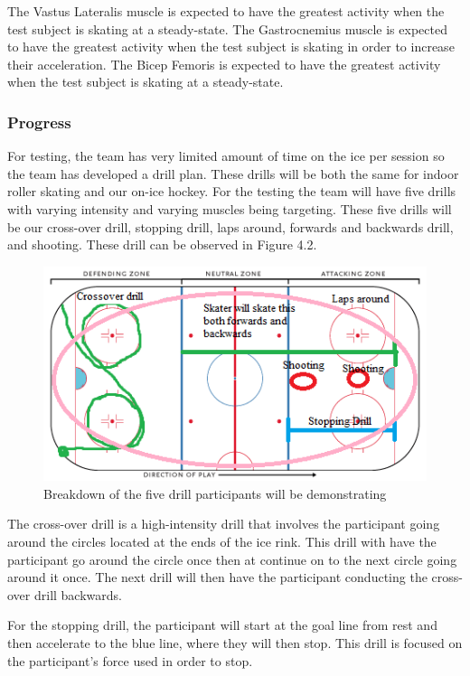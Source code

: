The Vastus Lateralis muscle is expected to have the greatest activity when the test subject is skating at a steady-state. The Gastrocnemius muscle is expected to have the greatest activity when the test subject is skating in order to increase their acceleration. The Bicep Femoris is expected to have the greatest activity when the test subject is skating at a steady-state.

\subsubsection{Progress}
For testing, the team has very limited amount of time on the ice per session so the team has developed a drill plan. These drills will be both the same for indoor roller skating and our on-ice hockey. For the testing the team will have five drills with varying intensity and varying muscles being targeting. These five drills will be our cross-over drill, stopping drill, laps around, forwards and backwards drill, and shooting. These drill can be observed in Figure 4.2.
\par
\begin{figure}[H]
\centering
\includegraphics{Progress_Report/figs/HockeyRink-Zones.png}
\caption{Breakdown of the five drill participants will be demonstrating\cite{4}}
\label{fig:HockeyRink}
\end{figure}
\par
The cross-over drill is a high-intensity drill that involves the participant going around the circles located at the ends of the ice rink. This drill with have the participant go around the circle once then at continue on to the next circle going around it once. The next drill will then have the participant conducting the cross-over drill backwards. 

For the stopping drill, the participant will start at the goal line from rest and then accelerate to the blue line, where they will then stop. This drill is focused on the participant's force used in order to stop. 

